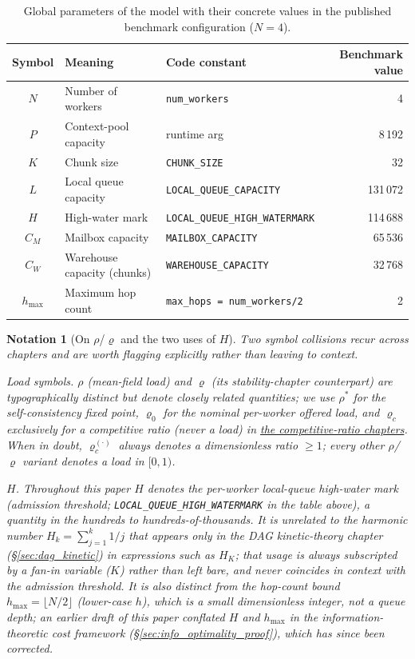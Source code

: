 \documentclass[11pt,a4paper]{article}
\newtheorem{notation}{Notation}[section]
\newcommand{\code}[1]{\texttt{#1}}
\begin{document}
\begin{table}[H]
\centering
\small
\caption{Global parameters of the model with their concrete values in
the published benchmark configuration ($N=4$).}
\label{tab:params}
\begin{tabular}{cll r}
\toprule
Symbol & Meaning & Code constant & Benchmark value \\
\midrule
$N$        & Number of workers       & \code{num\_workers}              & 4 \\
$P$        & Context-pool capacity   & runtime arg                       & 8\,192 \\
$K$        & Chunk size              & \code{CHUNK\_SIZE}                & 32 \\
$L$        & Local queue capacity    & \code{LOCAL\_QUEUE\_CAPACITY}     & 131\,072 \\
$H$        & High-water mark         & \code{LOCAL\_QUEUE\_HIGH\_WATERMARK} & 114\,688 \\
$C_M$      & Mailbox capacity        & \code{MAILBOX\_CAPACITY}          & 65\,536 \\
$C_W$      & Warehouse capacity (chunks) & \code{WAREHOUSE\_CAPACITY}    & 32\,768 \\
$h_{\max}$ & Maximum hop count       & \code{max\_hops = num\_workers/2} & 2 \\
\bottomrule
\end{tabular}
\end{table}

\begin{notation}[On $\rho$/$\varrho$ and the two uses of $H$]
\label{not:symbols}
Two symbol collisions recur across chapters and are worth flagging
explicitly rather than leaving to context.

\emph{Load symbols.} $\rho$ (mean-field load) and $\varrho$ (its
stability-chapter counterpart) are typographically distinct but
denote closely related quantities; we use $\rho^*$ for the
self-consistency fixed point, $\varrho_0$ for the nominal per-worker
offered load, and $\varrho_c$ exclusively for a \emph{competitive
ratio} (never a load) in \hyperref[chap:competitive_ratio]{the
competitive-ratio chapters}. When in doubt, $\varrho_c^{(\cdot)}$ always
denotes a dimensionless ratio $\geq 1$; every other $\rho$/$\varrho$
variant denotes a load in $[0,1)$.

\emph{$H$.} Throughout this paper $H$ denotes the per-worker local-queue
\emph{high-water mark} (admission threshold; \code{LOCAL\_QUEUE\_HIGH\_WATERMARK}
in the table above), a quantity in the hundreds to hundreds-of-thousands.
It is unrelated to the \emph{harmonic number} $H_k = \sum_{j=1}^k 1/j$
that appears only in the DAG kinetic-theory chapter
(\S\ref{sec:dag_kinetic}) in expressions such as $H_K$; that usage is
always subscripted by a fan-in variable ($K$) rather than left bare, and
never coincides in context with the admission threshold. It is also
distinct from the \emph{hop-count bound} $h_{\max} = \lfloor N/2
\rfloor$ (lower-case $h$), which is a small dimensionless integer, not a
queue depth; an earlier draft of this paper conflated $H$ and $h_{\max}$
in the information-theoretic cost framework (\S\ref{sec:info_optimality_proof}),
which has since been corrected.
\end{notation}
\end{document}
